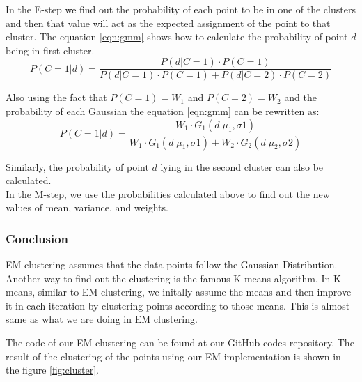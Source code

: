 \documentclass[journal, compsoc]{IEEEtran}
\begin{document}
In the E-step we find out the probability of each point to be in one of the clusters and then that value will act as the expected assignment
of the point to that cluster. The equation \ref{eqn:gmm} shows how to calculate the probability of point $d$ being in first cluster.
\begin{equation}
\label{eqn:gmm}
P(C = 1 | d) = \frac{P(d | C = 1)\cdot P(C = 1)}{P(d | C = 1)\cdot P(C = 1) + P(d | C = 2)\cdot P(C = 2)}
\end{equation}

Also using the fact that $P(C = 1) = W_{1}$ and $P(C = 2) = W_{2}$ and the probability of each Gaussian the equation \ref{eqn:gmm} can be
rewritten as:
\begin{equation}
\label{eqn:gmmfinal}
P(C = 1 | d) = \frac{W_{1} \cdot G_{1}(d | \mu_{1}, \sigma{1})}{W_1\cdot G_{1}(d | \mu_{1}, \sigma{1}) + W_2\cdot G_{2}(d | \mu_{2}, \sigma{2})}
\end{equation}

Similarly, the probability of point $d$ lying in the second cluster can also be calculated.\\

In the M-step, we use the probabilities calculated above to find out the new values of mean, variance, and weights.

\subsubsection{Conclusion}
EM clustering assumes that the data points follow the Gaussian Distribution. Another way to find out the clustering is the famous K-means algorithm.
In K-means, similar to EM clustering, we initally assume the means and then improve it in each iteration by clustering points according to those means.
This is almost same as what we are doing in EM clustering.

The code of our EM clustering can be found at our GitHub codes repository. The result of the clustering of the points using our EM implementation
is shown in the figure \ref{fig:cluster}.
\nocite{Do2008}
\nocite{HMM_Stamp}

\end{document}

